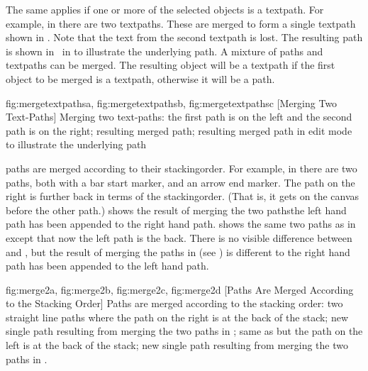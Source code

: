 The same applies if one or more of the selected \glspl*{object} is a
\gls{textpath}. For example, in 
there are two \glspl*{textpath}.  These are merged to form a single
\gls*{textpath} shown in . Note that
the text from the second \gls{textpath} is lost. The resulting path
is shown in \editpathmode\ in  to
illustrate the underlying path. A mixture of \glspl*{path} and
\glspl*{textpath} can be merged. The resulting \gls*{object} will be
a \gls*{textpath} if the first object to be merged is a
\gls*{textpath}, otherwise it will be a \gls*{path}.

{
  {fig:mergetextpathsa}{}{},
  {fig:mergetextpathsb}{}{},
  {fig:mergetextpathsc}{}{}
}
[Merging Two Text-Paths]
{Merging two text-paths:
 the first path is on the left and
the second path is on the right;
 resulting merged path;
 resulting merged path in
edit mode to illustrate the underlying path}

\Glspl{path} are merged according to their \gls{stackingorder}. For
example, in  there are two \glspl{path}, both
with a bar start marker, and an arrow end marker. The path on the
right is further back in terms of the \gls{stackingorder}. (That is,
it gets  on the \gls{canvas} before the
other path.)  shows the result of merging the
two paths\dash the left hand path has been appended to the right
hand path.  shows the same two paths as in
 except that now the left path is the
\gls{back}. There is no visible difference between
 and , but the result
of merging the paths in  (see
) is different to
\dash the right hand path has been appended
to the left hand path.

{
  {fig:merge2a}{}{},
  {fig:merge2b}{}{},
  {fig:merge2c}{}{},
  {fig:merge2d}{}{}
}
[Paths Are Merged According to the Stacking Order]
{Paths are merged according to the stacking order:
 two straight line paths where the path 
on the right is at the back of the stack;
 new single path resulting from merging 
the two paths in ;
 same as  but the path on the left
is at the back of the stack;
 new single path resulting from merging 
the two paths in .}

